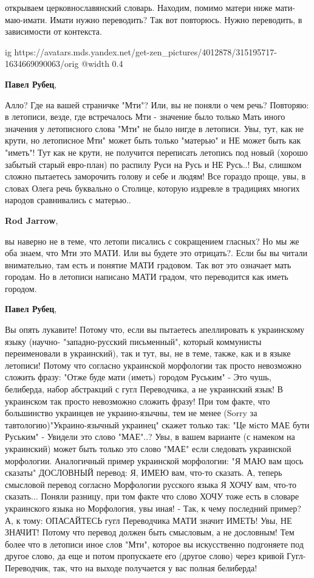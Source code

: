 \begin{itemize}
\begin{itemize}
открываем церковнославянский словарь. Находим, помимо матери ниже мати-маю-имати. Имати нужно переводить?
Так вот повторюсь. Нужно переводить, в зависимости от контекста.

\ifcmt
  ig https://avatars.mds.yandex.net/get-zen_pictures/4012878/315195717-1634669090063/orig
  @width 0.4
\fi

\textbf{Павел Рубец}, 

Алло? Где на вашей страничке "Мти"? Или, вы не поняли о чем речь? Повторяю: в
летописи, везде, где встречалось Мти - значение было только Мать иного значения
у летописного слова "Мти" не было нигде в летописи. Увы, тут, как не крути, но
летописное Мти" может быть только "матерью" и НЕ может быть как "иметь"! Тут
как не крути, не получится переписать летопись под новый (хорошо забытый старый
евро-план) по распилу Руси на Русь и НЕ Русь..! Вы, слишком сложно пытаетесь
заморочить голову и себе и людям! Все гораздо проще, увы, в словах Олега речь
буквально о Столице, которую издревле в традициях многих народов сравнивались с
матерью..

\textbf{Rod Jarrow}, 

вы наверно не в теме, что летопи писались с сокращением гласных? Но мы же оба
знаем, что Мти это МАТИ. Или вы будете это отрицать?. Если бы вы читали
внимательно, там есть и понятие МАТИ градовом. Так вот это означает мать
городам. Но в летописи написано МАТИ градом, что переводится как иметь городом.

\textbf{Павел Рубец}, 

Вы опять лукавите! Потому что, если вы пытаетесь апеллировать к украинскому
языку (научно- "западно-русский письменный", который коммунисты переименовали в
украинский), так и тут, вы, не в теме, также, как и в языке летописи! Потому
что согласно украинской морфологии так просто невозможно сложить фразу: "Отже
буде мати (иметь) городом Руським" - Это чушь, белиберда, набор абстракций с
гугл Переводчика, а не украинский язык! В украинском так просто невозможно
сложить фразу! При том факте, что большинство украинцев не украино-язычны, тем
не менее (Sorry за тавтологию)"Украино-язычный украинец" скажет только так: "Це
мiсто МАЕ бути Руським" - Увидели это слово "МАЕ"..? Увы, в вашем варианте (с
намеком на украинский) может быть только это слово "МАЕ" если следовать
украинской морфологии. Аналогичный пример украинской морфологии: "Я МАЮ вам
щось сказаты" ДОСЛОВНЫЙ перевод: Я, ИМЕЮ вам, что-то сказать. А, теперь
смысловой перевод согласно Морфологии русского языка Я ХОЧУ вам, что-то
сказать... Поняли разницу, при том факте что слово ХОЧУ тоже есть в словаре
украинского языка но Морфология, увы иная! - Так, к чему последний пример? А, к
тому: ОПАСАЙТЕСЬ гугл Переводчика МАТИ значит ИМЕТЬ! Увы, НЕ ЗНАЧИТ! Потому что
перевод должен быть смысловым, а не дословным! Тем более что в летописи иное
слов "Мти", которое вы искусственно подгоняете под другое слово, да еще и потом
пропускаете его (другое слово) через кривой Гугл-Переводчик, так, что на выходе
получается у вас полная белиберда!


\end{itemize}
\end{itemize}
